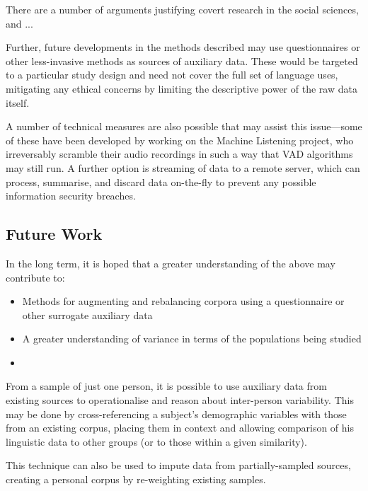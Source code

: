There are a number of arguments justifying covert research in the social sciences, and ...


Further, future developments in the methods described may use questionnaires or other less-invasive methods as sources of auxiliary data.  These would be targeted to a particular study design and need not cover the full set of language uses, mitigating any ethical concerns by limiting the descriptive power of the raw data itself.

A number of technical measures are also possible that may assist this issue---some of these have been developed by  working on the Machine Listening project, who irreversably scramble their audio recordings in such a way that VAD algorithms may still run.  A further option is streaming of data to a remote server, which can process, summarise, and discard data on-the-fly to prevent any possible information security breaches.











\subsection{Future Work}

In the long term, it is hoped that a greater understanding of the above may contribute to:

\begin{itemize}
    \item Methods for augmenting and rebalancing corpora using a questionnaire or other surrogate auxiliary data
    \item A greater understanding of variance in terms of the populations being studied
    \item 
\end{itemize}

From a sample of just one person, it is possible to use auxiliary data from existing sources to operationalise and reason about inter-person variability.  This may be done by cross-referencing a subject's demographic variables with those from an existing corpus, placing them in context and allowing comparison of his linguistic data to other groups (or to those within a given similarity).

This technique can also be used to impute data from partially-sampled sources, creating a personal corpus by re-weighting existing samples.

